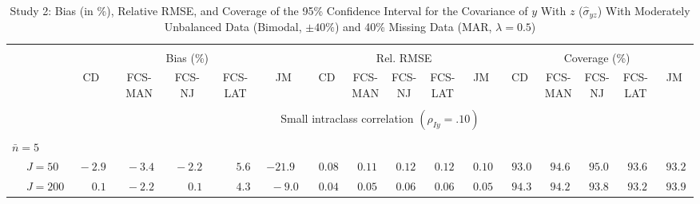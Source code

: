 \begin{sidewaystable}
\begin{threeparttable}
\setlength{\tabcolsep}{1.0pt}
\renewcommand{\arraystretch}{0.95}
\footnotesize
\caption{\small Study 2: Bias (in \%), Relative RMSE, and Coverage of the 95\% Confidence Interval for the Covariance of $y$ With $z$ ($\hat\sigma_{yz}$) With Moderately Unbalanced Data (Bimodal, $\pm 40\%$) and 40\% Missing Data (MAR, $\lambda=0.5$)}
\begin{tabular}{llccccccccccccccc}
\hline\\[-1.8ex]
& & \multicolumn{5}{c}{Bias (\%)} & \multicolumn{5}{c}{Rel. RMSE} & \multicolumn{5}{c}{Coverage (\%)} \\ \cmidrule(r){3-7}\cmidrule(r){8-12}\cmidrule(r){13-17}
 &  & CD & \makecell{FCS-\\MAN} & \makecell{FCS-\\NJ} & \makecell{FCS-\\LAT} & JM & CD & \makecell{FCS-\\MAN} & \makecell{FCS-\\NJ} & \makecell{FCS-\\LAT} & JM & CD & \makecell{FCS-\\MAN} & \makecell{FCS-\\NJ} & \makecell{FCS-\\LAT} & \multicolumn{1}{c}{JM} \\ 
[0.4ex]\hline\\[-1.8ex]
& & \multicolumn{15}{c}{Small intraclass correlation $(\rho_{Iy}=.10)$} \\[0.6ex]\hline\\[-1.8ex]
\multicolumn{4}{l}{$\bar{n}=5$} \\  & \nopagebreak $\;J=50$  & $\phantom{0}{-}2.9\phantom{0}$ & $\phantom{0}{-}3.4\phantom{0}$ & $\phantom{0}{-}2.2\phantom{0}$ & $\phantom{0}\phantom{-}5.6\phantom{0}$ & ${-}21.9\phantom{0}$ & $\phantom{0}0.08\phantom{0}$ & $\phantom{0}0.11\phantom{0}$ & $\phantom{0}0.12\phantom{0}$ & $\phantom{0}0.12\phantom{0}$ & $\phantom{0}0.10\phantom{0}$ & $\phantom{0}93.0\phantom{0}$ & $\phantom{0}94.6\phantom{0}$ & $\phantom{0}95.0\phantom{0}$ & $\phantom{0}93.6\phantom{0}$ & $\phantom{0}93.2\phantom{0}$ \\
 & \nopagebreak $\;J=200$  & $\phantom{0}\phantom{-}0.1\phantom{0}$ & $\phantom{0}{-}2.2\phantom{0}$ & $\phantom{0}\phantom{-}0.1\phantom{0}$ & $\phantom{0}\phantom{-}4.3\phantom{0}$ & $\phantom{0}{-}9.0\phantom{0}$ & $\phantom{0}0.04\phantom{0}$ & $\phantom{0}0.05\phantom{0}$ & $\phantom{0}0.06\phantom{0}$ & $\phantom{0}0.06\phantom{0}$ & $\phantom{0}0.05\phantom{0}$ & $\phantom{0}94.3\phantom{0}$ & $\phantom{0}94.2\phantom{0}$ & $\phantom{0}93.8\phantom{0}$ & $\phantom{0}93.2\phantom{0}$ & $\phantom{0}93.9\phantom{0}$ \\

\end{tabular}
\end{threeparttable}
\end{sidewaystable}
